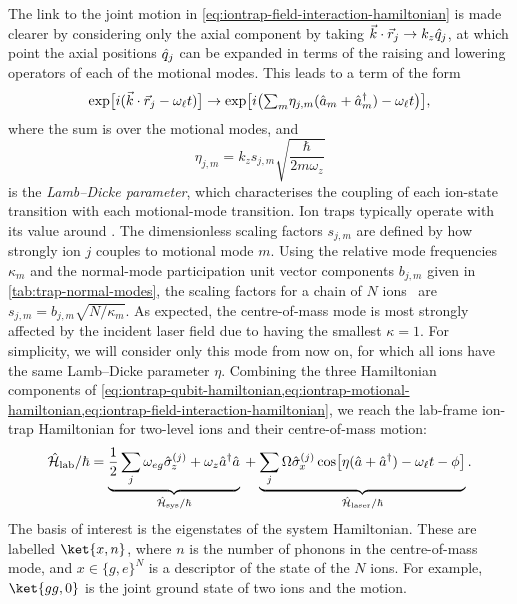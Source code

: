 The link to the joint motion in \cref{eq:iontrap-field-interaction-hamiltonian} is made clearer by considering only the axial component by taking $\vec k\cdot \vec r_j \to k_z\hat{q}_j$, at which point the axial positions $\hat{q}_j$ can be expanded in terms of the raising and lowering operators of each of the motional modes.
This leads to a term of the form
\begin{equation}
\exp\bigl[i(\vec k\cdot \vec r_j - \omega_\ell t)\bigr] \to \exp\bigl[i\bigl({\textstyle\sum_m} \eta_{j,m}(\hat{a}_m + \hat{a}^\dagger_m) - \omega_\ell t\bigr)\bigr],
\end{equation}
where the sum is over the motional modes, and
\begin{equation}
\eta_{j,m} = k_z s_{j,m} \sqrt{\frac\hbar{2m\omega_z}}
\end{equation}
is the \emph{Lamb--Dicke parameter}, which characterises the coupling of each ion-state transition with each motional-mode transition.
Ion traps typically operate with its value around .
The dimensionless scaling factors $s_{j,m}$ are defined by how strongly ion $j$ couples to motional mode $m$.
Using the relative mode frequencies $\kappa_m$ and the normal-mode participation unit vector components $b_{j,m}$ given in \cref{tab:trap-normal-modes}, the scaling factors for a chain of $N$ ions~\cite{James1998} are $s_{j,m} = b_{j,m}\sqrt{N/\kappa_m}$.
As expected, the centre-of-mass mode is most strongly affected by the incident laser field due to having the smallest $\kappa = 1$.
For simplicity, we will consider only this mode from now on, for which all ions have the same Lamb--Dicke parameter $\eta$.
Combining the three Hamiltonian components of \cref{eq:iontrap-qubit-hamiltonian,eq:iontrap-motional-hamiltonian,eq:iontrap-field-interaction-hamiltonian}, we reach the lab-frame ion-trap Hamiltonian for two-level ions and their centre-of-mass motion:
\begin{equation}\label{eq:iontrap-lab-hamiltonian}
\hat{\mathcal H}_{\text{lab}}/\hbar =
    \underbrace{\frac12\sum_j \omega_{eg}\hat{\sigma}_{\mkern-1mu z}^{(j)} + \omega_z\hat{a}^\dagger\hat{a}}_{\hat{\mathcal H}_{\text{sys}}/\hbar}
    {}+
    \underbrace{\sum_j\Omega\hat{\sigma}_{\mkern-1mu x}^{(j)}\cos\bigl[\eta(\hat{a} + \hat{a}^\dagger) - \omega_\ell t - \phi\bigr]}_{\hat{\mathcal H}_{\text{laser}}/\hbar}.
\end{equation}
The basis of interest is the eigenstates of the system Hamiltonian.
These are labelled $\ket{x,n}$, where $n$ is the number of phonons in the centre-of-mass mode, and $x\in{\{g,e\}}^N$ is a descriptor of the state of the $N$ ions.
For example, $\ket{gg,0}$ is the joint ground state of two ions and the motion.


